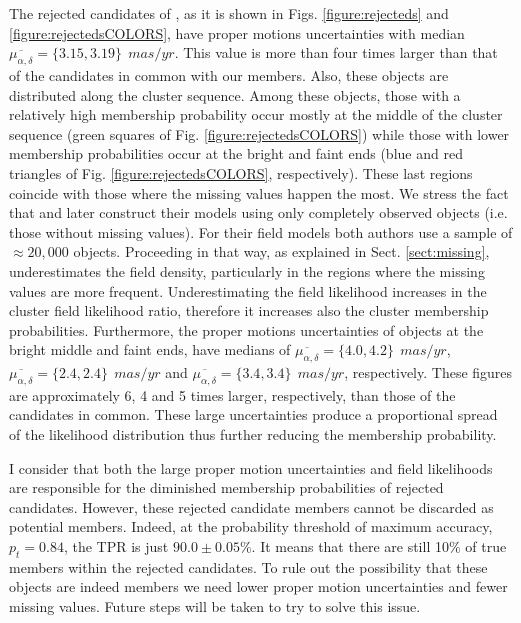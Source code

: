 The rejected candidates of \citet{Bouy2015}, as it is shown in Figs. \ref{figure:rejecteds} and \ref{figure:rejectedsCOLORS}, have proper motions uncertainties with median $\overline{\mu_{\alpha,\delta}}=\{3.15,3.19\} \ \ mas/yr$. This value is more than four times larger than that of the candidates in common with our members. Also, these objects are distributed along the cluster sequence. Among these objects, those with a relatively high membership probability occur mostly at the middle of the cluster sequence (green squares of Fig. \ref{figure:rejectedsCOLORS}) while those with lower membership probabilities occur at the bright and faint ends (blue and red triangles of Fig. \ref{figure:rejectedsCOLORS}, respectively). These last regions coincide with those where the missing values happen the most. We stress the fact that \citet{Sarro2014} and later \citet{Bouy2015} construct their models using only completely observed objects (i.e. those without missing values). For their field models both authors use a sample of $\approx 20,000$ objects. Proceeding in that way, as explained in Sect. \ref{sect:missing}, underestimates the field density, particularly in the regions where the missing values are more frequent. Underestimating the field likelihood increases in the cluster field likelihood ratio, therefore it increases also the cluster membership probabilities. Furthermore, the proper motions uncertainties of objects at the bright middle and faint ends, have medians of $\overline{\mu_{\alpha,\delta}}=\{4.0,4.2\} \ \ mas/yr$, $\overline{\mu_{\alpha,\delta}}=\{2.4,2.4\} \ \ mas/yr$ and $\overline{\mu_{\alpha,\delta}}=\{3.4,3.4\} \ \ mas/yr$, respectively. These figures are approximately 6, 4 and 5 times larger, respectively, than those of the candidates in common. These large uncertainties produce a proportional spread of the likelihood distribution thus further reducing the membership probability.

I consider that both the large proper motion uncertainties and field likelihoods are responsible for the diminished membership probabilities of \citet{Bouy2015} rejected candidates. However, these rejected candidate members cannot be discarded as potential members. Indeed, at the probability threshold of maximum accuracy, $p_t=0.84$, the TPR is just $90.0\pm0.05$\%. It means that there are still 10\% of true members within the rejected candidates. To rule out the possibility that these objects are indeed members we need lower proper motion uncertainties and fewer missing values. Future steps will be taken to try to solve this issue.

